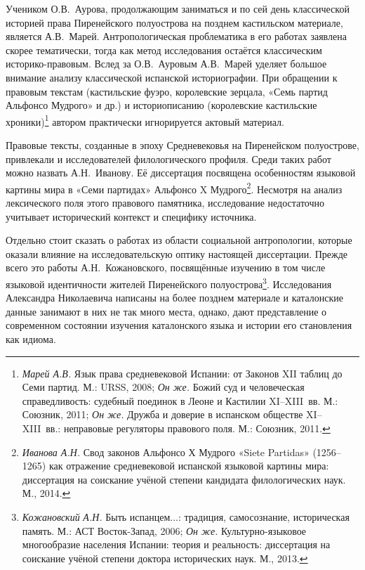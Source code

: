 Учеником О.В.~Аурова, продолжающим заниматься и по сей день классической историей права Пиренейского полуострова на позднем кастильском материале, является А.В.~Марей. Антропологическая проблематика в его работах заявлена скорее тематически, тогда как метод исследования остаётся классическим историко-правовым. Вслед за О.В.~Ауровым А.В.~Марей уделяет большое внимание анализу классической испанской историографии. При обращении к правовым текстам (кастильские фуэро, королевские зерцала, «Семь партид Альфонсо Мудрого» и др.) и историописанию (королевские кастильские хроники)\footnote{\emph{Марей А.В.} Язык права средневековой Испании: от Законов XII таблиц до Семи партид. М.: URSS, 2008; \emph{Он же.} Божий суд и человеческая справедливость: судебный поединок в Леоне и Кастилии XI--XIII~вв. М.: Союзник, 2011; \emph{Он же.} Дружба и доверие в испанском обществе XI--XIII~вв.: неправовые регуляторы правового поля. М.: Союзник, 2011.} автором практически игнорируется актовый материал.

Правовые тексты, созданные в эпоху Средневековья на Пиренейском полуострове, привлекали и исследователей филологического профиля. Среди таких работ можно назвать А.Н.~Иванову. Её диссертация посвящена особенностям языковой картины мира в «Семи партидах» Альфонсо X Мудрого\footnote{\emph{Иванова А.Н.} Свод законов Альфонсо Х Мудрого «Siete Partidas» (1256--1265) как отражение средневековой испанской языковой картины мира: диссертация на соискание учёной степени кандидата филологических наук. М., 2014.}. Несмотря на анализ лексического поля этого правового памятника, исследование недостаточно учитывает исторический контекст и специфику источника.

Отдельно стоит сказать о работах из области социальной антропологии, которые оказали влияние на исследовательскую оптику настоящей диссертации. Прежде всего это работы А.Н.~Кожановского, посвящённые изучению в том числе языковой идентичности жителей Пиренейского полуострова\footnote{\emph{Кожановский}\emph{ А.Н.} Быть испанцем...: традиция, самосознание, историческая память. М.: АСТ Восток-Запад, 2006; \emph{Он же.} Культурно-языковое многообразие населения Испании: теория и реальность: диссертация на соискание учёной степени доктора исторических наук. М., 2013.}. Исследования Александра Николаевича написаны на более позднем материале и каталонские данные занимают в них не так много места, однако, дают представление о современном состоянии изучения каталонского языка и истории его становления как идиома.

